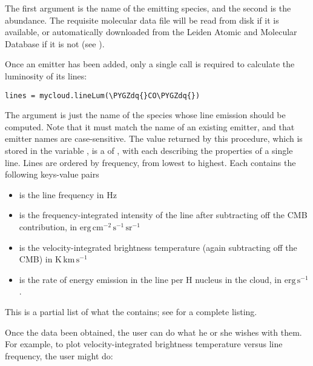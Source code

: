\documentclass[letterpaper,10pt,english]{sphinxmanual}
\def\PYGZdq{\char`\"}
\begin{document}
The first argument is the name of the emitting species, and the second
is the abundance. The requisite molecular data file will be read from
disk if it is available, or automatically downloaded from the Leiden
Atomic and Molecular Database if it is not (see {\hyperref[data:sec\string-data]{}}).

Once an emitter has been added, only a single call is required to
calculate the luminosity of its lines:

\begin{Verbatim}[commandchars=\\\{\}]
lines = mycloud.lineLum(\PYGZdq{}CO\PYGZdq{})
\end{Verbatim}

The argument is just the name of the species whose line emission
should be computed. Note that it must match the name of an existing
emitter, and that emitter names are case-sensitive. The value returned
by this procedure, which is stored in the variable , is a
 of , with each  describing the properties of
a single line. Lines are ordered by frequency, from lowest to
highest. Each  contains the following keys-value pairs
\begin{itemize}
\item {} 
 is the line frequency in Hz

\item {} 
 is the frequency-integrated intensity of the line
after subtracting off the CMB contribution, in
\(\mathrm{erg}\,\mathrm{cm}^{-2}\,\mathrm{s}^{-1}\,\mathrm{sr}^{-1}\)

\item {} 
 is the velocity-integrated brightness temperature (again
subtracting off the CMB) in
\(\mathrm{K}\,\mathrm{km}\,\mathrm{s}^{-1}\)

\item {} 
 is the rate of energy emission in the line per H nucleus
in the cloud, in \(\mathrm{erg}\,\mathrm{s}^{-1}\).

\end{itemize}

This is a partial list of what the  contains; see
{\hyperref[fulldoc:sssec\string-full\string-cloud]{}} for a complete listing.

Once the data been obtained, the user can do what he or she wishes
with them. For example, to plot velocity-integrated brightness
temperature versus line frequency, the user might do:
\end{document}
